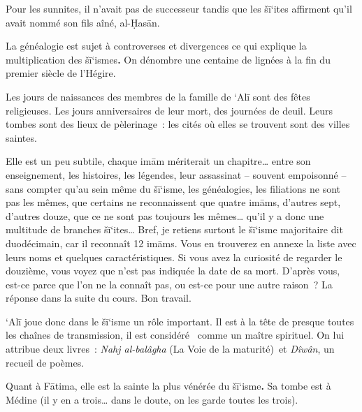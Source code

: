 Pour les sunnites, il n'avait pas de successeur tandis que les šī`ites
affirment qu'il avait nommé son fils aîné, al-Ḥasān.


La généalogie est sujet à controverses et divergences ce qui explique la
multiplication des šī`ismes\textbf{.} On dénombre une centaine de
lignées à la fin du premier siècle de l'Hégire.

Les jours de naissances des membres de la famille de `Alī sont des fêtes
religieuses. Les jours anniversaires de leur mort, des journées de
deuil. Leurs tombes sont des lieux de pèlerinage~: les cités où elles se
trouvent sont des villes saintes.

Elle est un peu subtile, chaque imām mériterait un chapitre\ldots{}
entre son enseignement, les histoires, les légendes, leur assassinat --
souvent empoisonné -- sans compter qu'au sein même du šī`isme, les
généalogies, les filiations ne sont pas les mêmes, que certains ne
reconnaissent que quatre imāms, d'autres sept, d'autres douze, que ce ne
sont pas toujours les mêmes\ldots{} qu'il y a donc une multitude de
branches šī`ites\ldots{} Bref, je retiens surtout le šī`isme majoritaire
dit duodécimain, car il reconnaît 12 imāms. Vous en trouverez en annexe
la liste avec leurs noms et quelques caractéristiques. Si vous avez la
curiosité de regarder le douzième, vous voyez que n'est pas indiquée la
date de sa mort. D'après vous, est-ce parce que l'on ne la connaît pas,
ou est-ce pour une autre raison~? La réponse dans la suite du cours. Bon
travail.


`Alī joue donc dans le šī`isme un rôle important. Il est à la tête de
presque toutes les chaînes de transmission, il est considéré ~comme un
maître spirituel. On lui attribue deux livres~: \emph{Nahj al-balâgha}
(La Voie de la maturité)~et \emph{Dîwân}, un recueil de poèmes.

Quant à Fātima, elle est la sainte la plus vénérée du šī`isme\textbf{.}
Sa tombe est à Médine (il y en a trois\ldots{} dans le doute, on les
garde toutes les trois).

